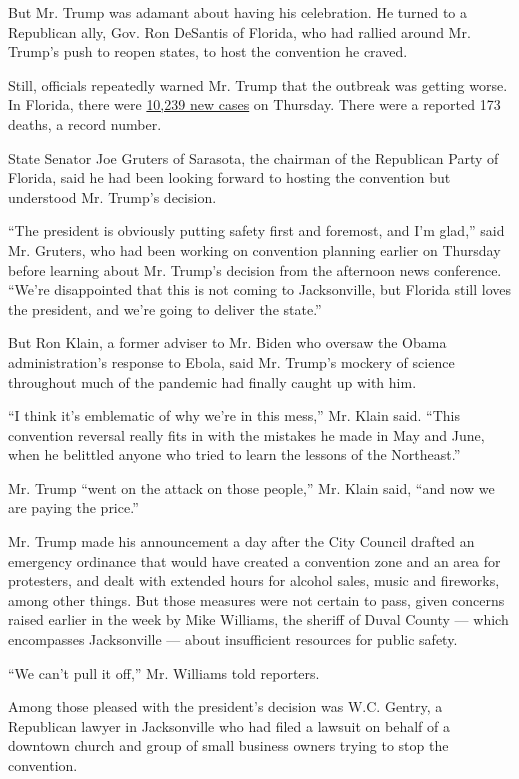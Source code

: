 But Mr. Trump was adamant about having his celebration. He turned to a
Republican ally, Gov. Ron DeSantis of Florida, who had rallied around
Mr. Trump's push to reopen states, to host the convention he craved.

Still, officials repeatedly warned Mr. Trump that the outbreak was
getting worse. In Florida, there were
\href{https://floridahealthcovid19.gov/}{10,239 new cases} on Thursday.
There were a reported 173 deaths, a record number.

State Senator Joe Gruters of Sarasota, the chairman of the Republican
Party of Florida, said he had been looking forward to hosting the
convention but understood Mr. Trump's decision.

``The president is obviously putting safety first and foremost, and I'm
glad,'' said Mr. Gruters, who had been working on convention planning
earlier on Thursday before learning about Mr. Trump's decision from the
afternoon news conference. ``We're disappointed that this is not coming
to Jacksonville, but Florida still loves the president, and we're going
to deliver the state.''

But Ron Klain, a former adviser to Mr. Biden who oversaw the Obama
administration's response to Ebola, said Mr. Trump's mockery of science
throughout much of the pandemic had finally caught up with him.

``I think it's emblematic of why we're in this mess,'' Mr. Klain said.
``This convention reversal really fits in with the mistakes he made in
May and June, when he belittled anyone who tried to learn the lessons of
the Northeast.''

Mr. Trump ``went on the attack on those people,'' Mr. Klain said, ``and
now we are paying the price.''

Mr. Trump made his announcement a day after the City Council drafted an
emergency ordinance that would have created a convention zone and an
area for protesters, and dealt with extended hours for alcohol sales,
music and fireworks, among other things. But those measures were not
certain to pass, given concerns raised earlier in the week by Mike
Williams, the sheriff of Duval County --- which encompasses Jacksonville
--- about insufficient resources for public safety.

``We can't pull it off,'' Mr. Williams told reporters.

Among those pleased with the president's decision was W.C. Gentry, a
Republican lawyer in Jacksonville who had filed a lawsuit on behalf of a
downtown church and group of small business owners trying to stop the
convention.

